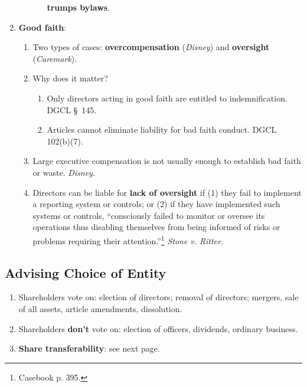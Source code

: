 \begin{enumerate}
\begin{enumerate}
\begin{enumerate}
            \textbf{trumps bylaws}.
        \end{enumerate}
    \end{enumerate}
    \item \textbf{Good faith}:
    \begin{enumerate}
        \item Two types of cases: \textbf{overcompensation} (\emph{Disney}) 
        and \textbf{oversight} (\emph{Caremark}).
        \item Why does it matter?
        \begin{enumerate}
            \item Only directors acting in good faith are entitled to 
            indemnification. DGCL \S\ 145.
            \item Articles cannot eliminate liability for bad faith conduct. 
            DGCL 102(b)(7).
        \end{enumerate}
        \item Large executive compensation is not usually enough to establish 
        bad faith or waste. \emph{Disney}.
        \item Directors can be liable for \textbf{lack of oversight} if (1) 
        they fail to implement a reporting system or controls; or (2) if they 
        have implemented such systems or controls, ``consciously failed to 
        monitor or oversee its operations thus disabling themselves from being 
        informed of risks or problems requiring their 
        attention.''\footnote{Casebook p. 395.} \emph{Stone v. Ritter}.
    \end{enumerate}
    
\end{enumerate}

\newpage

\subsection{Advising Choice of Entity}

\begin{enumerate}
    \item Shareholders vote on: election of directors; removal of directors; 
    mergers, sale of all assets, article amendments, dissolution.
    \item Shareholders \textbf{don't} vote on: election of officers, 
    dividends, ordinary business.
    \item \textbf{Share transferability}: see next page.
\end{enumerate}

